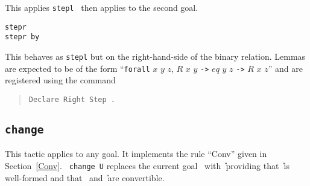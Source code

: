 \begin{coq_example*}
\begin{Variants}
This applies {\tt stepl {\term}} then applies {\tac} to the second goal.

\item{\tt stepr {\term}}\\
     {\tt stepr {\term} by {\tac}}

This behaves as {\tt stepl} but on the right-hand-side of the binary relation.
Lemmas are expected to be of the form
``{\tt forall} $x$ $y$
$z$, $R$ $x$ $y$ {\tt ->} $eq$ $y$ $z$ {\tt ->} $R$ $x$ $z$''
and are registered using the command
\begin{quote}
{\tt Declare Right Step {\term}.}
\end{quote}
\end{Variants}

\subsection{\tt change \term}
\label{change}

This tactic applies to any goal. It implements the rule
``Conv'' given in Section~\ref{Conv}.  {\tt
  change U} replaces the current goal \T\ with \U\ providing that
\U\ is well-formed and that \T\ and \U\ are convertible.

\begin{ErrMsgs}
\item {}
\end{ErrMsgs}

\end{coq_example*}
